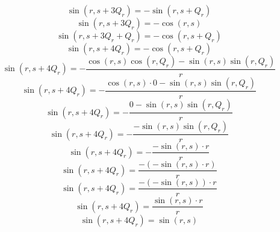 \documentclass[a4paper,12pt]{report}
\begin{document}
\begin{equation}
\sin(r,s + 3Q_r) = -\sin(r,s + Q_r)
\end{equation}
\begin{equation}
\sin(r,s + 3Q_r) = -\cos(r,s)
\end{equation}
\begin{equation}
\sin(r,s + 3Q_r + Q_r) = -\cos(r,s + Q_r)
\end{equation}
\begin{equation}
\sin(r,s + 4Q_r) = -\cos(r,s + Q_r)
\end{equation}
\begin{equation}
\sin(r,s + 4Q_r) = -\frac{\cos(r,s) \cos(r,Q_r) - \sin(r,s) \sin(r,Q_r)}{r}
\end{equation}
\begin{equation}
\sin(r,s + 4Q_r) = -\frac{\cos(r,s) \cdot 0 - \sin(r,s) \sin(r,Q_r)}{r}
\end{equation}
\begin{equation}
\sin(r,s + 4Q_r) = -\frac{0 - \sin(r,s) \sin(r,Q_r)}{r}
\end{equation}
\begin{equation}
\sin(r,s + 4Q_r) = -\frac{-\sin(r,s) \sin(r,Q_r)}{r}
\end{equation}
\begin{equation}
\sin(r,s + 4Q_r) = -\frac{-\sin(r,s) \cdot r}{r}
\end{equation}
\begin{equation}
\sin(r,s + 4Q_r) = \frac{-(-\sin(r,s) \cdot r)}{r}
\end{equation}
\begin{equation}
\sin(r,s + 4Q_r) = \frac{-(-\sin(r,s)) \cdot r}{r}
\end{equation}
\begin{equation}
\sin(r,s + 4Q_r) = \frac{\sin(r,s) \cdot r}{r}
\end{equation}
\begin{equation}
\sin(r,s + 4Q_r) = \sin(r,s)
\end{equation}
\end{document}
